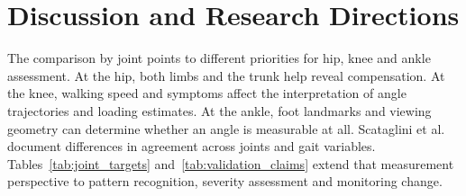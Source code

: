 \documentclass[12pt,nopreprintline]{elsarticle}
\begin{document}
\section{Discussion and Research Directions}
\label{sec:discussion}
\begin{revision}
The comparison by joint points to different priorities for hip, knee and ankle assessment. At the hip, both limbs and the trunk help reveal compensation. At the knee, walking speed and symptoms affect the interpretation of angle trajectories and loading estimates. At the ankle, foot landmarks and viewing geometry can determine whether an angle is measurable at all. Scataglini et al. \cite{scataglini2024accuracy} document differences in agreement across joints and gait variables. Tables~\ref{tab:joint_targets} and~\ref{tab:validation_claims} extend that measurement perspective to pattern recognition, severity assessment and monitoring change.
\end{revision}


\end{document}
